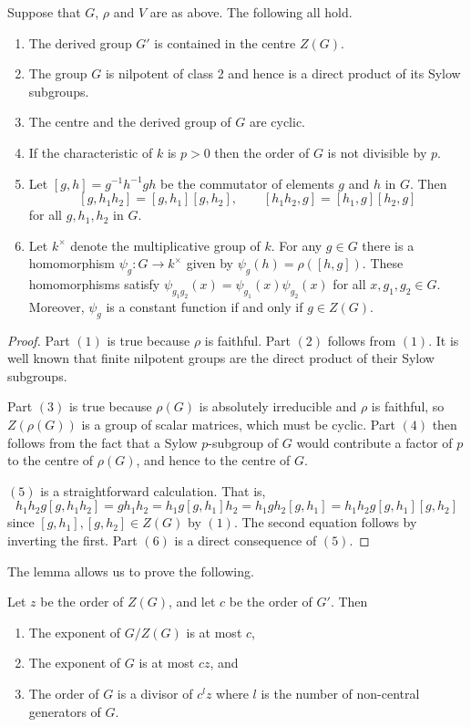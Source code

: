 \begin{Lemm} \label{lem:facts}
Suppose that $G$, $\rho$ and $V$ are as above. The following all hold. 
\begin{enumerate}
\item The derived group $G'$ is contained in the centre $Z(G)$. 
\item The group $G$ is nilpotent of class 2 and hence is a direct 
product of its Sylow subgroups. 
\item The centre and the derived group of $G$ are cyclic.
\item If the characteristic of $k$ is $p > 0$ then 
the order of $G$ is not divisible by $p$.
\item Let $[g,h] = g^{-1}h^{-1}gh$ be the commutator of elements 
$g$ and $h$ in $G$. Then 
\[ 
[g,h_1h_2] = [g,h_1][g,h_2], \qquad [h_1h_2,g] = [h_1,g][h_2,g]
\] 
for all $g,h_1,h_2$ in $G$. 
\item Let $k^\times$ denote the multiplicative group of $k$. For any $g \in 
G$ there is a homomorphism 
$\psi_g:G \longrightarrow k^\times$ given by $\psi_g(h) = \rho([h,g])$. These
homomorphisms satisfy 
$\psi_{g_1g_2}(x) =
\psi_{g_1}(x)\psi_{g_2}(x)$ for all $x, g_1, g_2 \in G$.
Moreover, $\psi_g$ is a constant function if and only if $g \in Z(G)$.
\end{enumerate}
\end{Lemm}

\begin{proof}
Part $(1)$ is true because $\rho$ is faithful. 
Part $(2)$ follows from $(1)$.  It is
well known that finite nilpotent groups are the direct product of 
their Sylow subgroups. 

Part $(3)$ is true because $\rho(G)$ is 
absolutely irreducible and $\rho$ is faithful, 
so $Z(\rho(G))$ is a group of scalar matrices, 
which must be cyclic. 
Part $(4)$ then follows from the fact that a Sylow $p$-subgroup of $G$
would contribute a factor of $p$ to the centre of $\rho(G)$, and hence
to the centre of $G$.

$(5)$ is a straightforward calculation. That is,
\[
h_1 h_2 g [g, h_1 h_2] = g h_1 h_2 = h_1 g [g, h_1] h_2 = h_1 g h_2 [g, h_1] 
= h_1 h_2 g [g, h_1] [g, h_2]
\]
since $[g, h_1], [g,h_2] \in Z(G)$ by $(1)$. 
The second equation follows by inverting the first. 
Part $(6)$  is a direct
consequence of $(5)$.
\end{proof}

The lemma allows us to prove the following. 

\begin{Prop} \label{exponents}
Let $z$ be the order of $Z(G)$, and let $c$ be the 
order of $G'$. Then 
\begin{enumerate}
\item The exponent of $G/Z(G)$ is at most $c$, 
\item The exponent of $G$ is at most $cz$, and 
\item The order of $G$ is a divisor of $c^{l}z$ where $l$ is the number of 
non-central generators of $G$.
\end{enumerate}
\end{Prop}

